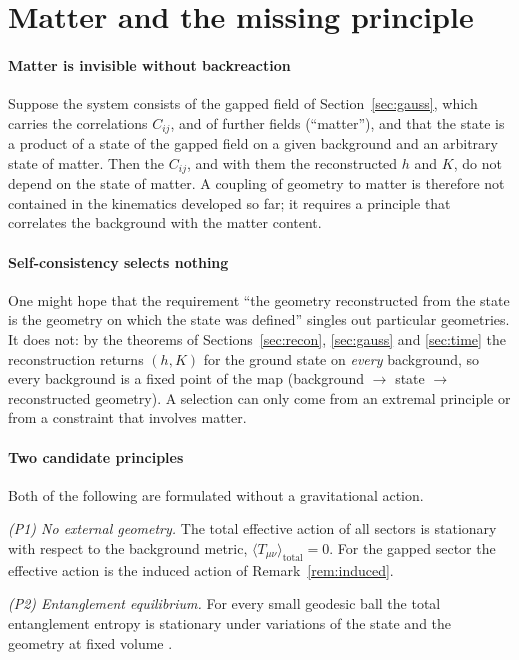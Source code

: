 \documentclass[11pt,a4paper]{article}
\theoremstyle{stmt}
\theoremstyle{defn}
\theoremstyle{rmk}
\numberwithin{equation}{section}
\begin{document}
\section{Matter and the missing principle}\label{sec:matter}

\paragraph{Matter is invisible without backreaction} Suppose the system consists of the gapped field of Section~\ref{sec:gauss}, which carries the correlations $C_{ij}$, and of further fields (``matter''), and that the state is a product of a state of the gapped field on a given background and an arbitrary state of matter. Then the $C_{ij}$, and with them the reconstructed $h$ and $K$, do not depend on the state of matter. A coupling of geometry to matter is therefore not contained in the kinematics developed so far; it requires a principle that correlates the background with the matter content.

\paragraph{Self-consistency selects nothing} One might hope that the requirement ``the geometry reconstructed from the state is the geometry on which the state was defined'' singles out particular geometries. It does not: by the theorems of Sections~\ref{sec:recon}, \ref{sec:gauss} and \ref{sec:time} the reconstruction returns $(h,K)$ for the ground state on \emph{every} background, so every background is a fixed point of the map (background $\to$ state $\to$ reconstructed geometry). A selection can only come from an extremal principle or from a constraint that involves matter.

\paragraph{Two candidate principles} Both of the following are formulated without a gravitational action.

\emph{(P1) No external geometry.} The total effective action of all sectors is stationary with respect to the background metric, $\langle T_{\mu\nu}\rangle_{\mathrm{total}}=0$. For the gapped sector the effective action is the induced action of Remark~\ref{rem:induced}.

\emph{(P2) Entanglement equilibrium.} For every small geodesic ball the total entanglement entropy is stationary under variations of the state and the geometry at fixed volume \cite{Jacobson16}.
\end{document}
